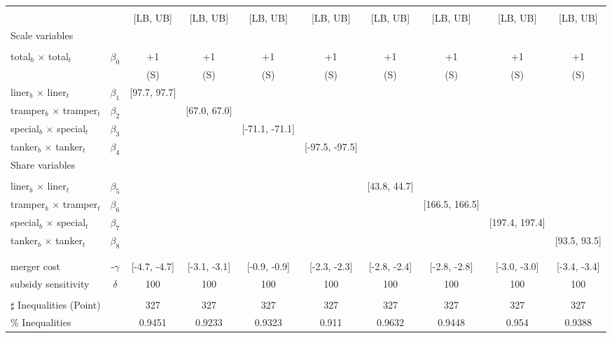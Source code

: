 \begin{tabular}{@{\extracolsep{5pt}}lccccccccc}
\toprule 
 &  &  &  &  &  &  &  &  &  \\
 &  & [LB, UB] & [LB, UB] & [LB, UB] & [LB, UB] & [LB, UB] & [LB, UB] & [LB, UB] & [LB, UB] \\
\midrule 
Scale variables &  &  &  &  &  &  &  \\
 &  &  &  &  &  &  &  &  \\
total$_{b}$ $\times$ total$_{t}$ & $\beta_0$ & +1 & +1 & +1 & +1 & +1 & +1 & +1 & +1 \\
 &  & (S) & (S) & (S) & (S) & (S) & (S) & (S) & (S) \\
liner$_{b}$ $\times$ liner$_{t}$ & $\beta_1$ & [97.7, 97.7] &  &  &  &  &  &  &  \\
tramper$_{b}$ $\times$ tramper$_{t}$ & $\beta_2$ &  & [67.0, 67.0] &  &  &  &  &  &  \\
special$_{b}$ $\times$ special$_{t}$ & $\beta_3$ &  &  & [-71.1, -71.1] &  &  &  &  &  \\
tanker$_{b}$ $\times$ tanker$_{t}$ & $\beta_4$ &  &  &  & [-97.5, -97.5] &  &  &  &  \\
Share variables &  &  &  &  &  &  &  &  &  \\
 &  &  &  &  &  &  &  &  &  \\
liner$_{b}$ $\times$ liner$_{t}$ & $\beta_5$ &  &  &  &  & [43.8, 44.7] &  &  &  \\
tramper$_{b}$ $\times$ tramper$_{t}$ & $\beta_6$ &  &  &  &  &  & [166.5, 166.5] &  &  \\
special$_{b}$ $\times$ special$_{t}$ & $\beta_7$ &  &  &  &  &  &  & [197.4, 197.4] &  \\
tanker$_{b}$ $\times$ tanker$_{t}$ & $\beta_8$ &  &  &  &  &  &  &  & [93.5, 93.5] \\
 &  &  &  &  &  &  &  &  &  \\
 &  &  &  &  &  &  &  &  &  \\
merger cost & -$\gamma$ & [-4.7, -4.7] & [-3.1, -3.1] & [-0.9, -0.9] & [-2.3, -2.3] & [-2.8, -2.4] & [-2.8, -2.8] & [-3.0, -3.0] & [-3.4, -3.4] \\
subsidy sensitivity & $\delta$ & 100 & 100 & 100 & 100 & 100 & 100 & 100 & 100 \\
 &  &  &  &  &  &  &  &  &  \\
\hline 
$\sharp$ Inequalities (Point) &  & 327 & 327 & 327 & 327 & 327 & 327 & 327 & 327 \\
\% Inequalities &  & 0.9451 & 0.9233 & 0.9323 & 0.911 & 0.9632 & 0.9448 & 0.954 & 0.9388 \\
\bottomrule 
\end{tabular}
